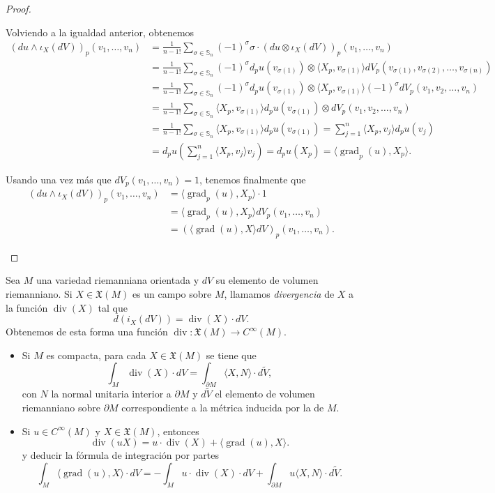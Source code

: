 \documentclass[11pt]{article}
\newcommand{\Ss}{\mathbb{S}}
\newcommand{\X}{\mathfrak{X}}
\renewcommand{\div}{\operatorname{div}}
\newcommand{\grad}{\operatorname{grad}}
\newcommand{\ip}[1]{\langle #1 \rangle}
\newcommand{\paint}[1]{\color{color}{#1}}
\newenvironment{exercise}[2][Ejercicio]{\begin{trivlist}
\item[\hskip \labelsep \paint{{\bfseries #1}}\hskip \labelsep {\bfseries #2.}]}{\end{trivlist}}
\begin{document}
\begin{proof}
\begin{itemize}[listparindent = \parindent]
Volviendo a la igualdad anterior, obtenemos
\begin{align*}
(du \wedge \iota_X(dV))_p(v_1,\dots,v_n) &= \frac{1}{n-1!}\sum_{\sigma \in \Ss_{n}}(-1)^\sigma \sigma \cdot (du \otimes \iota_X(dV))_p(v_1, \dots, v_n)\\
&= \frac{1}{n-1!}\sum_{\sigma \in \Ss_{n}}(-1)^\sigma d_pu(v_{\sigma(1)}) \otimes \ip{X_p,v_{\sigma(1)}}dV_p(v_{\sigma(1)},v_{\sigma(2)}, \dots, v_{\sigma(n)})\\
&= \frac{1}{n-1!}\sum_{\sigma \in \Ss_{n}}(-1)^\sigma d_pu(v_{\sigma(1)}) \otimes \ip{X_p,v_{\sigma(1)}}(-1)^\sigma dV_p(v_1,v_2, \dots, v_n)\\
&= \frac{1}{n-1!}\sum_{\sigma \in \Ss_{n}}\ip{X_p,v_{\sigma(1)}}d_pu(v_{\sigma(1)}) \otimes dV_p(v_1,v_2, \dots, v_n)\\
&= \frac{1}{n-1!}\sum_{\sigma \in \Ss_{n}}\ip{X_p,v_{\sigma(1)}}d_pu(v_{\sigma(1)}) = \sum_{j=1}^n\ip{X_p,v_j}d_pu(v_j)\\
&= d_pu\left(\sum_{j=1}^n\ip{X_p,v_j}v_j\right) = d_pu(X_p) = \ip{\grad_p(u),X_p}.
\end{align*}
 
Usando una vez más que $dV_p(v_1, \dots, v_n) = 1$, tenemos finalmente que
\begin{align*}
(du \wedge \iota_X(dV))_p(v_1,\dots,v_n) &= \ip{\grad_p(u),X_p} \cdot 1\\
&= \ip{\grad_p(u),X_p}dV_p(v_1, \dots, v_n)\\
& = (\ip{\grad(u),X}dV)_p(v_1, \dots, v_n).
\end{align*}
\end{itemize}
\end{proof}
\newpage
\begin{exercise}{9}Sea $M$ una variedad riemanniana orientada y $dV$ su elemento de
volumen riemanniano. Si $X \in \X(M)$ es un campo sobre $M$,
llamamos \emph{divergencia} de $X$ a la función $\div(X)$ tal que
  \[
  d(i_X(dV)) = \div(X)\cdot dV.
  \]
Obtenemos de esta forma una función $\div:\X(M)\to C^\infty(M)$.
\begin{itemize}[listparindent = \parindent]
\item[a)] Si $M$ es compacta, para cada $X\in\X(M)$ se tiene que
  \[
  \int_M\div(X)\cdot dV = \int_{\partial M}\ip{X,N}\cdot d\tilde{V},
  \]
con $N$ la normal unitaria interior a $\partial M$ y $d\tilde V$ el
elemento de volumen riemanniano sobre $\partial M$ correspondiente a la
métrica inducida por la de $M$.

\item[b)] Si $u\in C^\infty(M)$ y $X\in\X(M)$, entonces
  \[
  \div(uX) = u\cdot\div(X) + \ip{\grad(u),X}.
  \]
y deducir la fórmula de integración por partes
  \[
  \int_M\ip{\grad(u),X}\cdot dV  
        = -\int_M u\cdot\div(X)\cdot dV
          +\int_{\partial M}u\ip{X,N}\cdot d\tilde V.
  \]
\end{itemize}  
\end{exercise}
\end{document}
